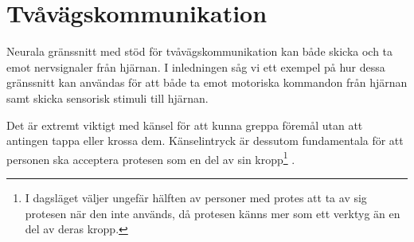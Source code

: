 \documentclass[12pt, a4paper]{article}
\begin{document}

\section{Tvåvägskommunikation}

Neurala gränssnitt med stöd för tvåvägskommunikation kan både skicka och ta emot nervsignaler från hjärnan. I inledningen såg vi ett exempel på hur dessa gränssnitt kan användas för att både ta emot motoriska kommandon från hjärnan samt skicka sensorisk stimuli till hjärnan.


Det är extremt viktigt med känsel för att kunna greppa föremål utan att antingen tappa eller krossa dem. Känselintryck är dessutom fundamentala för att personen ska acceptera protesen som en del av sin kropp\footnote{I dagsläget väljer ungefär hälften av personer med protes att ta av sig protesen när den inte används, då protesen känns mer som ett verktyg än en del av deras kropp.} \cite{prosthetic_operation}.

%
%
%
%
%
%
%


%
%
%
%
\end{document}
